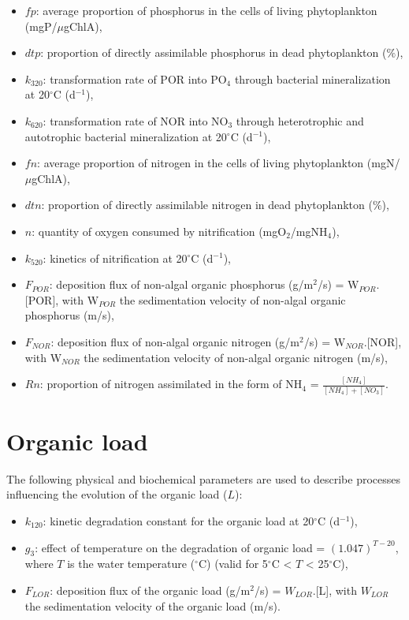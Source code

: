 \begin{itemize}
\item $fp$: average proportion of phosphorus in the cells of living phytoplankton (mgP/$\mu$gChlA),
\item $dtp$: proportion of directly assimilable phosphorus in dead phytoplankton ($\%$),
\item $k_{320}$: transformation rate of POR into PO$_4$ through bacterial mineralization
  at 20$^{\circ}$C (d$^{-1}$),
\item $k_{620}$: transformation rate of NOR into NO$_3$ through heterotrophic and autotrophic
  bacterial mineralization at 20$^{\circ}$C (d$^{-1}$),
\item $fn$: average proportion of nitrogen in the cells of living phytoplankton (mgN/$\mu$gChlA),
\item $dtn$: proportion of directly assimilable nitrogen in dead phytoplankton ($\%$),
\item $n$: quantity of oxygen consumed by nitrification (mgO$_2$/mgNH$_4$),
\item $k_{520}$: kinetics of nitrification at 20$^{\circ}$C (d$^{-1}$),
\item $F_{POR}$: deposition flux of non-algal organic phosphorus (g/m$^2$/s) = W$_{POR}$.[POR],
  with W$_{POR}$ the sedimentation velocity of non-algal organic phosphorus (m/s),
\item $F_{NOR}$: deposition flux of non-algal organic nitrogen (g/m$^2$/s) = W$_{NOR}$.[NOR],
  with W$_{NOR}$ the sedimentation velocity of non-algal organic nitrogen (m/s),
\item $Rn$: proportion of nitrogen assimilated in the form of NH$_4$ = $\frac{[NH_4]}{[NH_4]+[NO_3]}$.
\end{itemize}

\section{Organic load}

The following physical and biochemical parameters are used to describe processes
influencing the evolution of the organic load ($L$):

\begin{itemize}
\item $k_{120}$: kinetic degradation constant for the organic load at 20$^{\circ}$C (d$^{-1}$),
\item $g_3$: effect of temperature on the degradation of organic load = $(1.047)^{T-20}$,
  where $T$ is the water temperature ($^{\circ}$C) (valid for 5$^{\circ}$C < $T$ < 25$^{\circ}$C),
\item $F_{LOR}$: deposition flux of the organic load (g/m$^2$/s) = $W_{LOR}$.[L],
  with $W_{LOR}$ the sedimentation velocity of the organic load (m/s).
\end{itemize}

